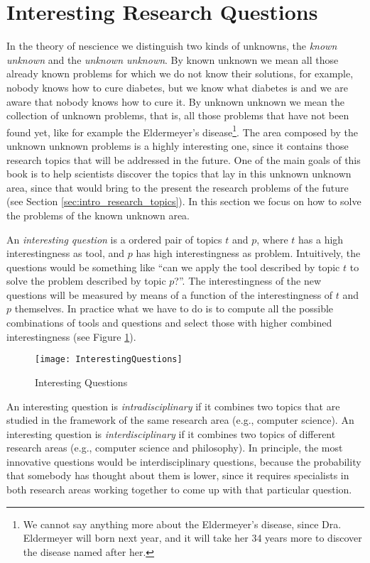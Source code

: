 %
%

\section{Interesting Research Questions}
\label{sec:intro_interesting_questions}

In the theory of nescience we distinguish two kinds of unknowns, the \emph{known unknown} and the \emph{unknown unknown}. By known unknown we mean all those already known problems for which we do not know their solutions, for example, nobody knows how to cure diabetes, but we know what diabetes is and we are aware that nobody knows how to cure it. By unknown unknown we mean the collection of unknown problems, that is, all those problems that have not been found yet, like for example the Eldermeyer's disease\footnote{We cannot say anything more about the Eldermeyer's disease, since Dra. Eldermeyer will born next year, and it will take her 34 years more to discover the disease named after her.}. The area composed by the unknown unknown problems is a highly interesting one, since it contains those research topics that will be addressed in the future. One of the main goals of this book is to help scientists discover the topics that lay in this unknown unknown area, since that would bring to the present the research problems of the future (see Section \ref{sec:intro_research_topics}). In this section we focus on how to solve the problems of the known unknown area.

An \emph{interesting question} is a ordered pair of topics $t$ and $p$, where $t$ has a high interestingness as tool, and $p$ has high interestingness as problem. Intuitively, the questions would be something like “can we apply the tool described by topic $t$ to solve the problem described by topic $p$?”. The interestingness of the new questions will be measured by means of a function of the interestingness of $t$ and $p$ themselves. In practice what we have to do is to compute all the possible combinations of tools and questions and select those with higher combined interestingness (see Figure \ref{fig:InterestingQuestions}).

\begin{figure}[h]
\centering\texttt{[image: InterestingQuestions]}
\caption{\label{fig:InterestingQuestions}Interesting Questions}
\end{figure}

An interesting question is \emph{intradisciplinary} if it combines two topics that are studied in the framework of the same research area (e.g., computer science). An interesting question is \emph{interdisciplinary} if it combines two topics of different research areas (e.g., computer science and philosophy). In principle, the most innovative questions would be interdisciplinary questions, because the probability that somebody has thought about them is lower, since it requires specialists in both research areas working together to come up with that particular question.

